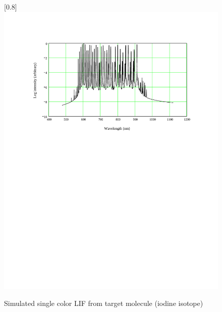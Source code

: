 \begin{figure}
\scalebox{0.8}[0.8]{
\includegraphics[bb=50 450 489 680]
{target_1/target_1.pdf}
}
\caption[Simulated single color LIF from target molecule (iodine isotope)]{Simulated single color LIF from target molecule (iodine isotope)}
\label{target_1}
\end{figure}
